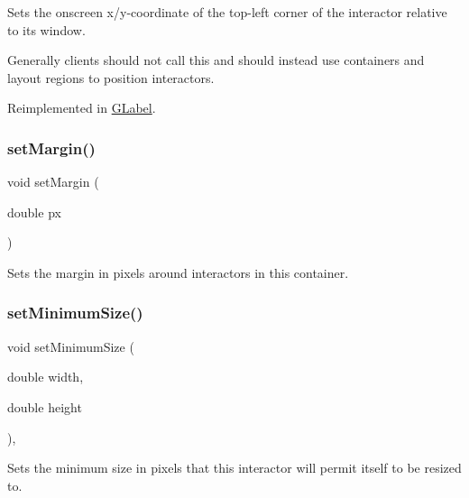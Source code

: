Sets the onscreen x/y-\/coordinate of the top-\/left corner of the interactor relative to its window. 

Generally clients should not call this and should instead use containers and layout regions to position interactors. 

Reimplemented in \mbox{\hyperlink{classGLabel_a40e39a7bf1b0b46b3a5710bb9a0d214b}{G\+Label}}.

\mbox{\label{classGContainer_a79b7a5ffc0a63c8f11be4ed59808f60d}} 
\subsubsection{\texorpdfstring{set\+Margin()}{setMargin()}}
{\footnotesize\ttfamily void set\+Margin (\begin{DoxyParamCaption}\item[{double}]{px }\end{DoxyParamCaption})\hspace{0.3cm}{\ttfamily [virtual]}}



Sets the margin in pixels around interactors in this container. 

\mbox{\label{classGInteractor_a0cf428e207b7f22cc08138a90b1b87b2}} 
\subsubsection{\texorpdfstring{set\+Minimum\+Size()}{setMinimumSize()}\hspace{0.1cm}{\footnotesize\ttfamily [1/2]}}
{\footnotesize\ttfamily void set\+Minimum\+Size (\begin{DoxyParamCaption}\item[{double}]{width,  }\item[{double}]{height }\end{DoxyParamCaption})\hspace{0.3cm}{\ttfamily [virtual]}, {\ttfamily [inherited]}}



Sets the minimum size in pixels that this interactor will permit itself to be resized to. 


